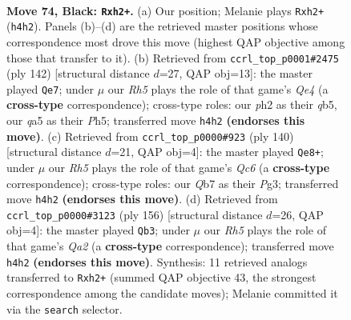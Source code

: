\documentclass[11pt]{article}
\begin{document}
\clearpage

\begin{figure}[p]\centering
\begin{subfigure}{0.46\textwidth}\centering
\resizebox{\linewidth}{!}{%
\newchessgame
\chessboard[
  setfen={8/1q5k/5p2/Q7/7r/6P1/5K1P/8 b - - 4 74},
  showmover=false,
  pgfstyle=straightmove, color=movearrow, markmove={h4-h2}
]}
\caption{}
\end{subfigure}\hfill
\begin{subfigure}{0.46\textwidth}\centering
\resizebox{\linewidth}{!}{%
\newchessgame
\chessboard[
  setfen={7k/1P4p1/8/1q1p3P/4Q3/4K3/8/8 w - - 0 72},
  showmover=false,
  pgfstyle=straightmove, color=movearrow, markmove={e4-e7}
]}
\caption{}
\end{subfigure}
\\[4pt]
\begin{subfigure}{0.46\textwidth}\centering
\resizebox{\linewidth}{!}{%
\newchessgame
\chessboard[
  setfen={2K4k/6p1/2Q4p/P7/8/6P1/7q/8 w - - 0 71},
  showmover=false,
  pgfstyle=straightmove, color=movearrow, markmove={c6-e8}
]}
\caption{}
\end{subfigure}\hfill
\begin{subfigure}{0.46\textwidth}\centering
\resizebox{\linewidth}{!}{%
\newchessgame
\chessboard[
  setfen={8/7k/4K3/2q5/6P1/p7/Q7/8 w - - 0 79},
  showmover=false,
  pgfstyle=straightmove, color=movearrow, markmove={a2-b3}
]}
\caption{}
\end{subfigure}
\caption{\textbf{Move 74, Black: \texttt{Rxh2+}.} (a) Our position; Melanie plays \texttt{Rxh2+} (\texttt{h4h2}). Panels (b)--(d) are the retrieved master positions whose correspondence most drove this move (highest QAP objective among those that transfer to it). (b) Retrieved from \texttt{ccrl\_top\_p0001\#2475} (ply 142) [structural distance $d$=27, QAP obj=13]: the master played \texttt{Qe7}; under $\mu$ our \emph{Rh5} plays the role of that game's \emph{Qe4} (a \textbf{cross-type} correspondence); cross-type roles: our \emph{p}h2 as their \emph{q}b5, our \emph{q}a5 as their \emph{P}h5; transferred move \texttt{h4h2} \textbf{(endorses this move)}. (c) Retrieved from \texttt{ccrl\_top\_p0000\#923} (ply 140) [structural distance $d$=21, QAP obj=4]: the master played \texttt{Qe8+}; under $\mu$ our \emph{Rh5} plays the role of that game's \emph{Qc6} (a \textbf{cross-type} correspondence); cross-type roles: our \emph{Q}b7 as their \emph{P}g3; transferred move \texttt{h4h2} \textbf{(endorses this move)}. (d) Retrieved from \texttt{ccrl\_top\_p0000\#3123} (ply 156) [structural distance $d$=26, QAP obj=4]: the master played \texttt{Qb3}; under $\mu$ our \emph{Rh5} plays the role of that game's \emph{Qa2} (a \textbf{cross-type} correspondence); transferred move \texttt{h4h2} \textbf{(endorses this move)}. Synthesis: 11 retrieved analogs transferred to \texttt{Rxh2+} (summed QAP objective 43, the strongest correspondence among the candidate moves); Melanie committed it via the \texttt{search} selector.}
\label{fig:thought-m147}
\end{figure}
\end{document}
